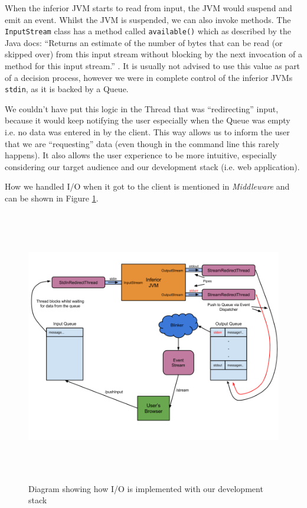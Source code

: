 \documentclass[11pt, a4paper]{article}
\begin{document}
When the inferior JVM starts to read from input, the JVM would suspend and emit an event.
Whilst the JVM is suspended, we can also invoke methods.
The \texttt{InputStream} class has a method called \texttt{available()} which as described by the Java docs: ``Returns an estimate of the number of bytes that can be read (or skipped over) from this input stream without blocking by the next invocation of a method for this input stream.'' \cite{java_available}.
It is usually not advised to use this value as part of a decision process, however we were in complete control of the inferior JVMs \texttt{stdin}, as it is backed by a Queue.

We couldn't have put this logic in the Thread that was ``redirecting'' input, because it would keep notifying the user especially when the Queue was empty i.e. no data was entered in by the client.
This way allows us to inform the user that we are ``requesting'' data (even though in the command line this rarely happens).
It also allows the user experience to be more intuitive, especially considering our target audience and our development stack (i.e. web application).

How we handled I/O when it got to the client is mentioned in \emph{Middleware} and can be shown in Figure \ref{fig:iostack}.
\begin{figure}[h!]
\centering
\includegraphics[width=160mm, height=120mm]{iodiagram.png}
\caption{Diagram showing how I/O is implemented with our development stack}
\label{fig:iostack}
\end{figure}
\end{document}

